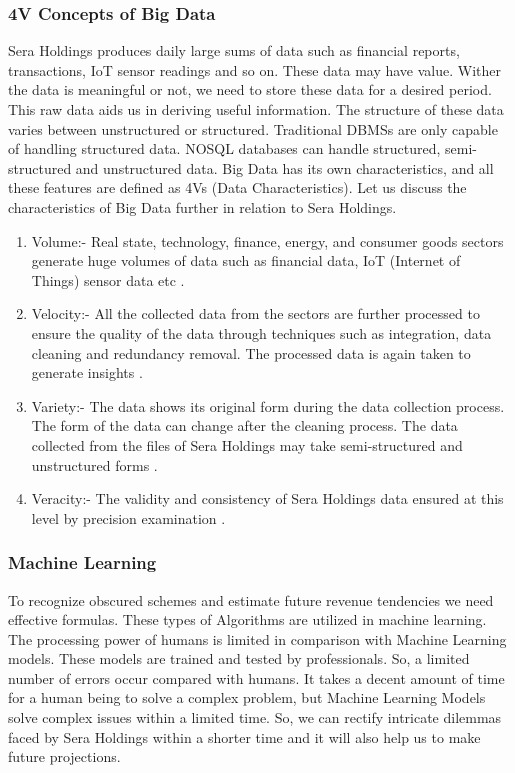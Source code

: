 \documentclass[12pt,a4Paper]{article}
\begin{document}
\subsubsection{4V Concepts of Big Data}
Sera Holdings produces daily large sums of data such as financial reports, transactions, IoT sensor readings and so on. These data may have value. Wither the data is meaningful or not, we need to store these data for a desired period. This raw data aids us in deriving useful information. The structure of these data varies between unstructured or structured. Traditional DBMSs are only capable of handling structured data. NOSQL databases can handle structured, semi-structured and unstructured data. Big Data has its own characteristics, and all these features are defined as 4Vs (Data Characteristics). Let us discuss the characteristics of Big Data further in relation to Sera Holdings. 
\begin{enumerate}
\item Volume:- Real state, technology, finance, energy, and consumer goods sectors generate huge volumes of data such as financial data, IoT (Internet of Things) sensor data etc \citep{website1}.
\item Velocity:- All the collected data from the sectors are further processed to ensure the quality of the data through techniques such as integration, data cleaning and redundancy removal. The processed data is again taken to generate insights \citep{website3} \citep{website2}.
\item Variety:- The data shows its original form during the data collection process. The form of the data can change after the cleaning process. The data collected from the files of Sera Holdings may take semi-structured and unstructured forms \citep{website4}.
\item Veracity:- The validity and consistency of Sera Holdings data ensured at this level by precision examination \citep{website5}.
\end{enumerate} 
\subsubsection{Machine Learning}
To recognize obscured schemes and estimate future revenue tendencies we need effective formulas. These types of Algorithms are utilized in machine learning. The processing power of humans is limited in comparison with Machine Learning models. These models are trained and tested by professionals. So, a limited number of errors occur compared with humans. It takes a decent amount of time for a human being to solve a complex problem, but Machine Learning Models solve complex issues within a limited time. So, we can rectify intricate dilemmas faced by Sera Holdings within a shorter time and it will also help us to make future projections. 
\end{document}

